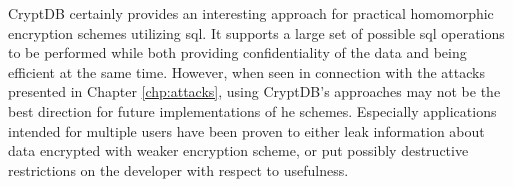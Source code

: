 CryptDB certainly provides an interesting approach for practical homomorphic encryption schemes utilizing \gls{sql}. It supports a large set of possible \gls{sql} operations to be performed while both providing confidentiality of the data and being efficient at the same time. However, when seen in connection with the attacks presented in Chapter \ref{chp:attacks}, using CryptDB's approaches may not be the best direction for future implementations of \gls{he} schemes. Especially applications intended for multiple users have been proven to either leak information about data encrypted with weaker encryption scheme, or put possibly destructive restrictions on the developer with respect to usefulness. 


